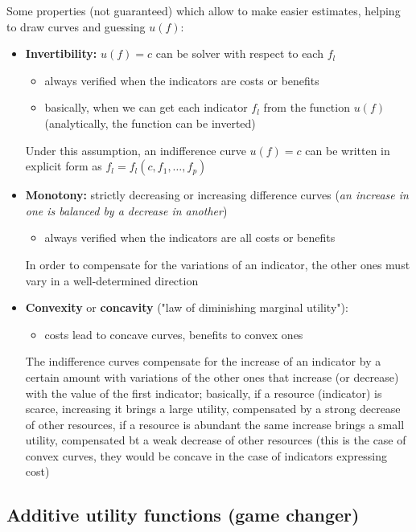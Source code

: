 Some properties (not guaranteed) which allow to make easier estimates, helping to draw curves and guessing $u(f)$:
\begin{itemize}
	\item \textbf{Invertibility:} $u(f)= c$ can be solver with respect to each $f_l$
	\begin{itemize}
		\item always verified when the indicators are costs or benefits
		
		\item basically, when we can get each indicator $f_l$ from the function $u(f)$ (analytically, the function can be inverted)
	\end{itemize}
	Under this assumption, an indifference curve $u(f) = c$ can be written in explicit form as $f_l = f_l (c, f_1, \dots, f_p)$
	
	\item \textbf{Monotony:} strictly decreasing or increasing difference curves (\textit{an increase in one is balanced by a decrease in another})
	\begin{itemize}
		\item always verified when the indicators are all costs or benefits
	\end{itemize}
	In order to compensate for the variations of an indicator, the other ones must vary in a well-determined direction
	
	\item \textbf{Convexity} or \textbf{concavity} ("law of diminishing marginal utility"): 
	\begin{itemize}
		\item costs lead to concave curves, benefits to convex ones
	\end{itemize}
	The indifference curves compensate for the increase of an indicator by a certain amount with variations of the other ones that increase (or decrease) with the value of the first indicator; basically, if a resource (indicator) is scarce, increasing it brings a large utility, compensated by a strong decrease of other resources, if a resource is abundant the same increase brings a small utility, compensated bt a weak decrease of other resources (this is the case of convex curves, they would be concave in the case of indicators expressing cost)
\end{itemize}

\subsection{Additive utility functions (game changer)}

